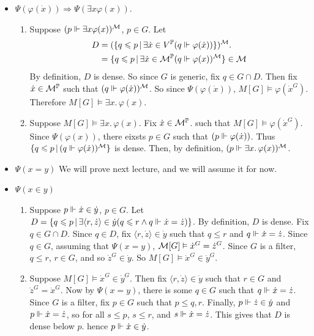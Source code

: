 \documentclass{article}
\begin{document}
\begin{itemize}
\begin{enumerate}
              \end{enumerate}
        \item $\Psi(\varphi(\dot{x})) \Rightarrow \Psi(\exists x \varphi(x)).$
              \begin{enumerate}
                  \item Suppose $(p \Vdash \exists x \varphi(x))^{\mathcal{M}}$, $p \in G$. Let \begin{align*}
                            D & = (\{ q \leqslant p \, | \, \exists \dot{x} \in V^{\mathbb{P}} ( q \Vdash \varphi(\dot{x}))\})^{\mathcal{M}}.      \\
                              & = \{ q \leqslant p \, | \, \exists \dot{x} \in \mathcal{M}^{\mathbb{P}} (q \Vdash \varphi(x))^{\mathcal{M}} \} \in \mathcal{M}
                        \end{align*}
                        By definition, $D$ is dense. So since $G$ is generic, fix $q \in G \cap D$. Then fix $\dot{x} \in \mathcal{M}^{\mathbb{P}}$ such that $(q \Vdash \varphi(\dot{x}))^{\mathcal{M}}$. So since $\Psi(\varphi(\dot{x}))$, $M[G] \models \varphi(\dot{x}^{G})$. Therefore $M[G] \models \exists x. \, \varphi(x)$.
                  \item Suppose $M[G] \models \exists x. \, \varphi(x)$. Fix $\dot{x} \in \mathcal{M}^{\mathbb{P}}$. such that $M[G] \models \varphi(\dot{x}^{G})$. Since $\Psi(\varphi(x))$, there eixsts $p \in G$ such that $(p \Vdash \varphi(\dot{x}))$. Thus $\{ q \leqslant p \, | \, (q \Vdash \varphi(\dot{x}))^{\mathcal{M}}\}$ is dense. Then, by definition, $(p \Vdash \exists x. \, \varphi(x))^{\mathcal{M}}$.
              \end{enumerate}
        \item $\Psi(x=y)$ We will prove next lecture, and we will assume it for now.
        \item $\Psi(x \in y)$ \begin{enumerate}
                  \item[(i)] Suppose $p \Vdash \dot{x} \in \dot{y}$, $p \in G$. Let $D = \{ q \leqslant p \, | \, \exists \langle r, \dot{z}\rangle \in \dot{y} (q \leqslant r \wedge q \Vdash \dot{x} = \dot{z})\}$. By definition, $D$ is dense. Fix $q \in G \cap D$. Since $q \in D$, fix $\langle r, \dot{z} \rangle \in \dot{y}$ such that $q \leq r$ and $q \Vdash \dot{x} = \dot{z}$. Since $q \in G$, assuming that $\Psi(x=y)$, $\mathcal{M}[G] \vDash \dot{x}^{G} = \dot{z}^{G}$. Since $G$ is a filter, $q \leq r$, $r \in G$, and so $\dot{z}^{G} \in \dot{y}$. So $M[G] \models \dot{x}^{G} \in \dot{y}^{G}$.
                  \item[(ii)] Suppose $M[G] \models \dot{x}^{G} \in \dot{y}^{G}$. Then fix $\langle r, \dot{z} \rangle \in \dot{y}$ such that $r \in G$ and $\dot{z}^{G} = \dot{x}^{G}$. Now by $\Psi(x=y)$, there is some $q \in G$ such that $q \Vdash \dot{x} = \dot{z}$. Since $G$ is a filter, fix $p \in G$ such that $p \leq q,r$. Finally, $p \Vdash \dot{z} \in \dot{y}$ and $p \Vdash \dot{x}=\dot{z}$, so for all $s \leq p$, $s \leq r$, and $s \Vdash \dot{x} = \dot{z}$. This gives that $D$ is dense below $p$. hence $p \Vdash \dot{x} \in \dot{y}$.
              \end{enumerate}
    \end{itemize}
    \endproof
\end{document}
